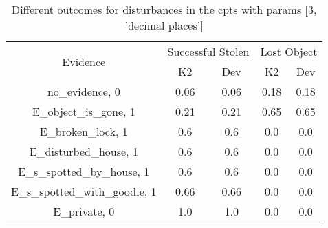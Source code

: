 \begin{table}\begin{tabular}{c|cc|cc}\toprule\multirow{2}{*}{Evidence} & \multicolumn{2}{c}{Successful Stolen} & \multicolumn{2}{c}{Lost Object} \\& {K2} & {Dev} & {K2} & {Dev} \\\midrule
no\_evidence, 0 & 0.06&0.06&0.18&0.18\\E\_object\_is\_gone, 1 & 0.21&0.21&0.65&0.65\\E\_broken\_lock, 1 & 0.6&0.6&0.0&0.0\\E\_disturbed\_house, 1 & 0.6&0.6&0.0&0.0\\E\_s\_spotted\_by\_house, 1 & 0.6&0.6&0.0&0.0\\E\_s\_spotted\_with\_goodie, 1 & 0.66&0.66&0.0&0.0\\E\_private, 0 & 1.0&1.0&0.0&0.0\\\bottomrule\end{tabular}\caption{Different outcomes for disturbances in the cpts with params [3, 'decimal places']}\end{table}